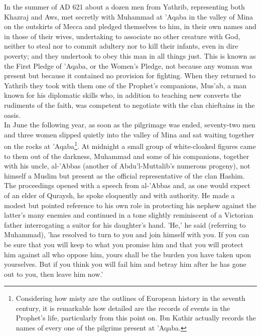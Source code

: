 \documentclass[10pt, twoside,openright]{book}
\begin{document}
In the summer of AD 621 about a dozen men from Yathrib, representing both Khazraj and Aws, met 
secretly with Muhammad at 'Aqaba in the valley of Mina on the outskirts of Mecca and pledged 
themselves to him, in their own names and in those of their wives, undertaking to associate no other 
creature with God, neither to steal nor to commit adultery nor to kill their infants, even in dire 
poverty; and they undertook to obey this man in all things just. This is known as the First Pledge of 
'Aqaba, or the Women's Pledge, not because any woman was present but because it contained no 
provision for fighting. When they returned to Yathrib they took with them one of the Prophet's 
companions, Mus'ab, a man known for his diplomatic skills who, in addition to teaching new converts 
the rudiments of the faith, was competent to negotiate with the clan chieftains in the oasis. \\

In June the following year, as soon as the pilgrimage was ended, seventy-two men and three women 
slipped quietly into the valley of Mina and sat waiting together on the rocks at 'Aqaba\footnote{Considering how misty are the outlines of European history in the seventh century, it is remarkable how detailed are the records of events in the Prophet's life, particularly from this point on. Ibn Kathir actually records the names of every one of the pilgrims present at 'Aqaba.}. At midnight a small group of white\hyp{}cloaked figures came to them out of the darkness, Muhammad and some of his companions, together with his uncle, al\hyp{}'Abbas (another of Abdu'l\hyp{}Muttalib's numerous progeny), not himself a Muslim but present as the official representative of the clan Hashim. The proceedings opened with a speech from al\hyp{}'Abbas and, as one would expect of an elder of Quraysh, he spoke eloquently and with authority. He made a modest but pointed reference to his own role in protecting his nephew against the latter's many enemies and continued in a tone slightly reminiscent of a Victorian father interrogating a suitor for his daughter's hand. 'He,' he said (referring to Muhammad), 'has resolved to turn to you and join himself with you. If you can be sure that you will keep to what you promise him and that you will protect him against all who oppose him, yours shall be the burden you have taken upon yourselves. But if you think you will fail him and betray him after he has gone out to you, then leave him now.' \\
\end{document}
